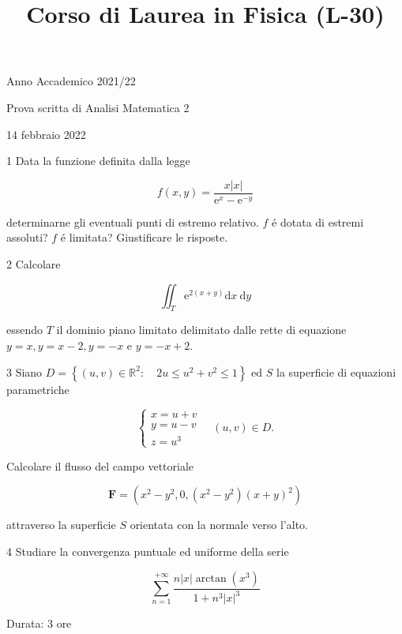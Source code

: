 \documentclass[10pt]{article}
\title{Corso di Laurea in Fisica (L-30) }
\author{}
\date{}
\begin{document}
\maketitle
Anno Accademico 2021/22

Prova scritta di Analisi Matematica 2

14 febbraio 2022

1 Data la funzione definita dalla legge

\[
f(x, y)=\frac{x|x|}{\mathrm{e}^{x}-\mathrm{e}^{-y}}
\]

determinarne gli eventuali punti di estremo relativo. \(f\) é dotata di estremi assoluti? \(f\) é limitata? Giustificare le risposte.

2 Calcolare

\[
\iint_{T} \mathrm{e}^{2(x+y)} \mathrm{d} x \mathrm{~d} y
\]

essendo \(T\) il dominio piano limitato delimitato dalle rette di equazione \(y=x, y=x-2, y=-x\) e \(y=-x+2\).

3 Siano \(D=\left\{(u, v) \in \mathbb{R}^{2}: \quad 2 u \leq u^{2}+v^{2} \leq 1\right\}\) ed \(S\) la superficie di equazioni parametriche

\[
\left\{\begin{array}{l}
x=u+v \\
y=u-v \\
z=u^{3}
\end{array} \quad(u, v) \in D .\right.
\]

Calcolare il flusso del campo vettoriale

\[
\mathbf{F}=\left(x^{2}-y^{2}, 0,\left(x^{2}-y^{2}\right)(x+y)^{2}\right)
\]

attraverso la superficie \(S\) orientata con la normale verso l'alto.

4 Studiare la convergenza puntuale ed uniforme della serie

\[
\sum_{n=1}^{+\infty} \frac{n|x| \arctan \left(x^{3}\right)}{1+n^{3}|x|^{3}}
\]

Durata: 3 ore
\end{document}
